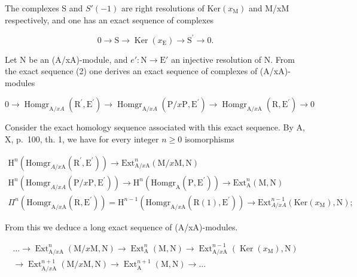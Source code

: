 The complexes S and \(S'(-1)\) are right resolutions of \(\mathrm{Ker}(x_{\mathrm{M}})\) and M/xM respectively, and one has an exact sequence of complexes

\[
0 \to \mathrm{S} \longrightarrow \operatorname{Ker} (x _ {\mathrm{E}}) \longrightarrow \mathrm{S} ^ {\prime} \to 0.\tag{3}
\]

Let N be an (A/xA)-module, and \(e': \mathrm{N} \to \mathrm{E}'\) an injective resolution of N. From the exact sequence (2) one derives an exact sequence of complexes of (A/xA)-modules

\[
0 \to \operatorname{Homgr} _ {\mathrm{A} / x A} \left(\mathrm{R} ^ {\prime}, \mathrm{E} ^ {\prime}\right) \longrightarrow \operatorname{Homgr} _ {\mathrm{A} / x A} \left(\mathrm{P} / x \mathrm{P}, \mathrm{E} ^ {\prime}\right) \longrightarrow \operatorname{Homgr} _ {\mathrm{A} / x \mathrm{A}} \left(\mathrm{R}, \mathrm{E} ^ {\prime}\right)\rightarrow 0
\]

Consider the exact homology sequence associated with this exact sequence. By A, X, p.~100, th. 1, we have for every integer \(n \geqslant 0\) isomorphisms

\[
\begin{array}{c} \mathrm{H} ^ {n} (\mathrm{Homgr} _ {A / x \mathrm{A}} (\mathrm{R} ^ {\prime}, \mathrm{E} ^ {\prime})) \longrightarrow \mathrm{Ext} _ {\mathrm{A} / x \mathrm{A}} ^ {n} (\mathrm{M} / x \mathrm{M}, \mathrm{N}) \\ \mathrm{H} ^ {n} (\mathrm{Homgr} _ {A / x A} (\mathrm{P} / x \mathrm{P}, \mathrm{E} ^ {\prime})) \longrightarrow \mathrm{H} ^ {n} (\mathrm{Homgr} _ {\mathrm{A}} (\mathrm{P}, \mathrm{E} ^ {\prime})) \longrightarrow \mathrm{Ext} _ {\mathrm{A}} ^ {n} (\mathrm{M}, \mathrm{N}) \\ \Pi^ {n} (\mathrm{Homgr} _ {\mathrm{A} / x \mathrm{A}} (\mathrm{R}, \mathrm{E} ^ {\prime})) = \mathrm{H} ^ {n - 1} (\mathrm{Homgr} _ {\mathrm{A} / x \mathrm{A}} (\mathrm{R} (1), \mathrm{E} ^ {\prime})) \longrightarrow \mathrm{Ext} _ {A / x A} ^ {n - 1} (\mathrm{Ker} (x _ {\mathrm{M}}), \mathrm{N}); \end{array}
\]

From this we deduce a long exact sequence of (A/xA)-modules.

\[
\begin{array}{c} \dots \longrightarrow \operatorname{Ext} _ {\mathrm{A} / x \mathrm{A}} ^ {n} (\mathrm{M} / x \mathrm{M}, \mathrm{N}) \longrightarrow \operatorname{Ext} _ {\mathrm{A}} ^ {n} (\mathrm{M}, \mathrm{N}) \longrightarrow \operatorname{Ext} _ {\mathrm{A} / x \mathrm{A}} ^ {n - 1} (\operatorname{Ker} (x _ {\mathrm{M}}), \mathrm{N}) \\ \longrightarrow \operatorname{Ext} _ {\mathrm{A} / x \mathrm{A}} ^ {n + 1} (\mathrm{M} / x \mathrm{M}, \mathrm{N}) \longrightarrow \operatorname{Ext} _ {\mathrm{A}} ^ {n + 1} (\mathrm{M}, \mathrm{N}) \longrightarrow \dots \end{array}\tag{4}
\]

